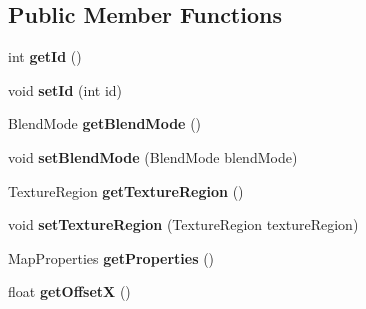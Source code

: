 \subsection*{Public Member Functions}
\begin{DoxyCompactItemize}
\item 
\mbox{\label{classnl_1_1arjanfrans_1_1mario_1_1model_1_1Tile_a936ccffb6b17ccfd84450edff0aadf03}} 
int {\bfseries get\+Id} ()
\item 
\mbox{\label{classnl_1_1arjanfrans_1_1mario_1_1model_1_1Tile_a86fd5aa7a4544e10dd7597f238245f77}} 
void {\bfseries set\+Id} (int id)
\item 
\mbox{\label{classnl_1_1arjanfrans_1_1mario_1_1model_1_1Tile_ac2e9cbb680eeb3caadb1c614a66049f7}} 
Blend\+Mode {\bfseries get\+Blend\+Mode} ()
\item 
\mbox{\label{classnl_1_1arjanfrans_1_1mario_1_1model_1_1Tile_a5e15b8a0fb73af3da56a07be0f0176e8}} 
void {\bfseries set\+Blend\+Mode} (Blend\+Mode blend\+Mode)
\item 
\mbox{\label{classnl_1_1arjanfrans_1_1mario_1_1model_1_1Tile_a8ed2f182e9907c254597fff487cae146}} 
Texture\+Region {\bfseries get\+Texture\+Region} ()
\item 
\mbox{\label{classnl_1_1arjanfrans_1_1mario_1_1model_1_1Tile_adb386d505d43773473324757c158659f}} 
void {\bfseries set\+Texture\+Region} (Texture\+Region texture\+Region)
\item 
\mbox{\label{classnl_1_1arjanfrans_1_1mario_1_1model_1_1Tile_a55dc285ea0024afe988f0e215a1cc0ec}} 
Map\+Properties {\bfseries get\+Properties} ()
\item 
\mbox{\label{classnl_1_1arjanfrans_1_1mario_1_1model_1_1Tile_a6fc4fc889d5f58d2aa8e783082fdc50e}} 
float {\bfseries get\+OffsetX} ()
\item 

\end{DoxyCompactItemize}
